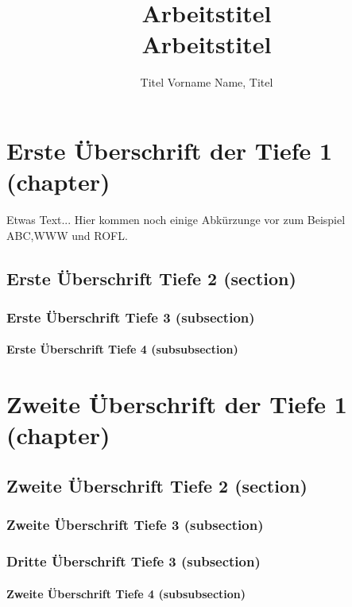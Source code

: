\documentclass[Master,BMR,english]{BASE/twbook}
\title{Arbeitstitel\\Arbeitstitel}
\author{Titel Vorname Name, Titel}
\begin{document}
\maketitle
\chapter{Erste Überschrift der Tiefe 1 (chapter)}
Etwas Text... Hier kommen noch einige Abkürzunge vor zum Beispiel \ac{ABC},\ac{WWW} und \ac{ROFL}.

\section{Erste Überschrift Tiefe 2 (section)}
\blindtext

\subsection{Erste Überschrift Tiefe 3 (subsection)}
\blindtext

\subsubsection{Erste Überschrift Tiefe 4 (subsubsection)}
\blindtext

\chapter{Zweite Überschrift der Tiefe 1 (chapter)}
\blindtext

\section{Zweite Überschrift Tiefe 2 (section)}
\blindtext

\subsection{Zweite Überschrift Tiefe 3 (subsection)}
\blindtext

\subsection{Dritte Überschrift Tiefe 3 (subsection)}
\blindtext

\subsubsection{Zweite Überschrift Tiefe 4 (subsubsection)}
\blindtext
\end{document}
